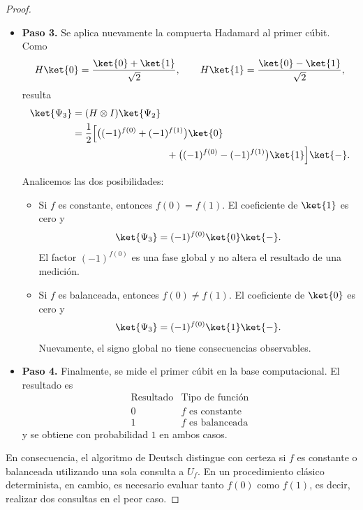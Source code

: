 \documentclass[a4,10pt]{aleph-notas}
\begin{document}
\begin{proof}
\begin{itemize}
        \item \textbf{Paso 3.} Se aplica nuevamente la compuerta Hadamard al primer cúbit. Como
        \[
            H\ket{0}=\frac{\ket{0}+\ket{1}}{\sqrt{2}},
            \qquad
            H\ket{1}=\frac{\ket{0}-\ket{1}}{\sqrt{2}},
        \]
        resulta
        \begin{align*}
            \ket{\Psi_3}
            &=(H\otimes I)\ket{\Psi_2}\\
            &=\frac{1}{2}\Bigl[
                \bigl((-1)^{f(0)}+(-1)^{f(1)}\bigr)\ket{0}\\
            &\hspace{3.4cm}
                +\bigl((-1)^{f(0)}-(-1)^{f(1)}\bigr)\ket{1}
            \Bigr]\ket{-}.
        \end{align*}

        Analicemos las dos posibilidades:
        \begin{itemize}
            \item Si \(f\) es constante, entonces \(f(0)=f(1)\). El coeficiente de \(\ket{1}\) es cero y
            \[
                \ket{\Psi_3}=(-1)^{f(0)}\ket{0}\ket{-}.
            \]
            El factor \((-1)^{f(0)}\) es una fase global y no altera el resultado de una medición.

            \item Si \(f\) es balanceada, entonces \(f(0)\neq f(1)\). El coeficiente de \(\ket{0}\) es cero y
            \[
                \ket{\Psi_3}=(-1)^{f(0)}\ket{1}\ket{-}.
            \]
            Nuevamente, el signo global no tiene consecuencias observables.
        \end{itemize}

        \item \textbf{Paso 4.} Finalmente, se mide el primer cúbit en la base computacional. El resultado es
        \[
            \begin{array}{c|c}
                \text{Resultado} & \text{Tipo de función}\\
                \hline
                0 & f\text{ es constante}\\
                1 & f\text{ es balanceada}
            \end{array}
        \]
        y se obtiene con probabilidad \(1\) en ambos casos.
    \end{itemize}

    En consecuencia, el algoritmo de Deutsch distingue con certeza si \(f\) es constante o balanceada utilizando una sola consulta a \(U_f\). En un procedimiento clásico determinista, en cambio, es necesario evaluar tanto \(f(0)\) como \(f(1)\), es decir, realizar dos consultas en el peor caso.
\end{proof}
\end{document}

